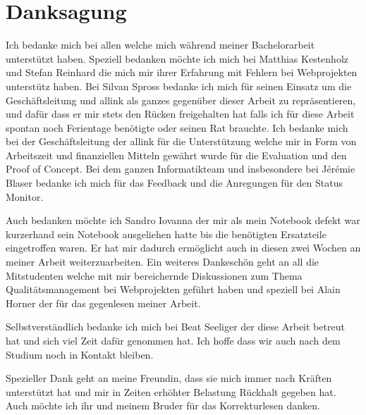 \section{Danksagung}
\label{sec:danksagung}
Ich bedanke mich bei allen welche mich während meiner Bachelorarbeit unterstützt haben. Speziell bedanken möchte ich mich bei Matthias Kestenholz und Stefan Reinhard die mich mir ihrer Erfahrung mit Fehlern bei Webprojekten unterstütz haben. Bei Silvan Spross bedanke ich mich für seinen Einsatz um die Geschäftsleitung und allink als ganzes gegenüber dieser Arbeit zu repräsentieren, und dafür dass er mir stets den Rücken freigehalten hat falls ich für diese Arbeit spontan noch Ferientage benötigte oder seinen Rat brauchte. Ich bedanke mich bei der Geschäftsleitung der allink für die Unterstützung welche mir in Form von Arbeitszeit und finanziellen Mitteln gewährt wurde für die Evaluation und den Proof of Concept. Bei dem ganzen Informatikteam und insbesondere bei Jérémie Blaser bedanke ich mich für das Feedback und die Anregungen für den Status Monitor.

Auch bedanken möchte ich Sandro Iovanna der mir als mein Notebook defekt war kurzerhand sein Notebook ausgeliehen hatte bis die benötigten Ersatzteile eingetroffen waren. Er hat mir dadurch ermöglicht auch in diesen zwei Wochen an meiner Arbeit weiterzuarbeiten. Ein weiteres Dankeschön geht an all die Mitstudenten welche mit mir bereichernde Diskussionen zum Thema Qualitätsmanagement bei Webprojekten geführt haben und speziell bei Alain Horner der für das gegenlesen meiner Arbeit.

Selbstverständlich bedanke ich mich bei Beat Seeliger der diese Arbeit betreut hat und sich viel Zeit dafür genommen hat. Ich hoffe dass wir auch nach dem Studium noch in Kontakt bleiben.

Spezieller Dank geht an meine Freundin, dass sie mich immer nach Kräften unterstützt hat und mir in Zeiten erhöhter Belastung Rückhalt gegeben hat. Auch möchte ich ihr und meinem Bruder für das Korrekturlesen danken.
